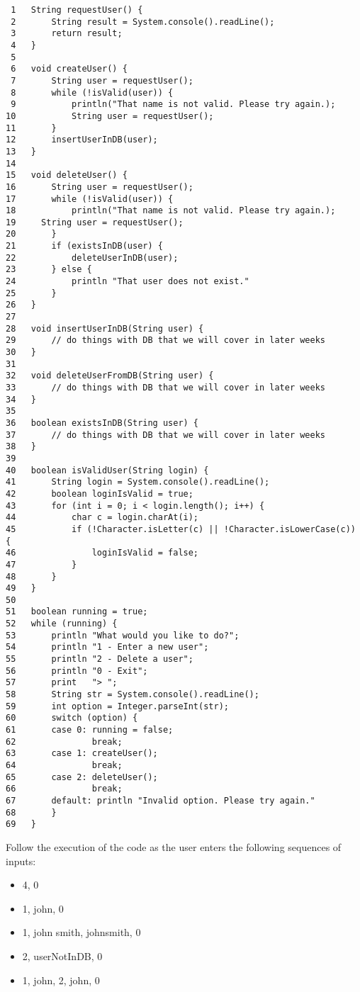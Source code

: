 \documentclass{article}
\begin{document}
\begin{verbatim}
 1   String requestUser() {
 2       String result = System.console().readLine();
 3       return result;
 4   }
 5   
 6   void createUser() {
 7       String user = requestUser();
 8       while (!isValid(user)) {
 9           println("That name is not valid. Please try again.);
10           String user = requestUser();
11       }
12       insertUserInDB(user);
13   }
14   
15   void deleteUser() {
16       String user = requestUser();
17       while (!isValid(user)) {
18           println("That name is not valid. Please try again.);
19     String user = requestUser();
20       }
21       if (existsInDB(user) {
22           deleteUserInDB(user);
23       } else {
24           println "That user does not exist."
25       }
26   }
27   
28   void insertUserInDB(String user) {
29       // do things with DB that we will cover in later weeks
30   }
31   
32   void deleteUserFromDB(String user) {
33       // do things with DB that we will cover in later weeks
34   }
35   
36   boolean existsInDB(String user) {
37       // do things with DB that we will cover in later weeks
38   }
39   
40   boolean isValidUser(String login) {
41       String login = System.console().readLine();
42       boolean loginIsValid = true;
43       for (int i = 0; i < login.length(); i++) {
44           char c = login.charAt(i);
45           if (!Character.isLetter(c) || !Character.isLowerCase(c)) {
46               loginIsValid = false;
47           }
48       }
49   }
50   
51   boolean running = true;
52   while (running) { 
53       println "What would you like to do?";
54       println "1 - Enter a new user";
55       println "2 - Delete a user";
56       println "0 - Exit";
57       print   "> ";
58       String str = System.console().readLine();
59       int option = Integer.parseInt(str);
60       switch (option) {
61       case 0: running = false;
62               break;
63       case 1: createUser();
64               break;
65       case 2: deleteUser();
66               break;
67       default: println "Invalid option. Please try again."
68       }
69   }
\end{verbatim}

Follow the execution of the code as the user enters the following
sequences of inputs:

\begin{itemize}
\item 4, 0
\item 1, john, 0
\item 1, john smith, johnsmith, 0
\item 2, userNotInDB, 0
\item 1, john, 2, john, 0
\end{itemize}
\end{document}
